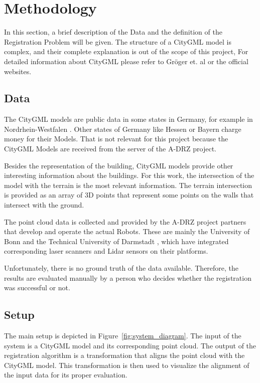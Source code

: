 

    \chapter{Methodology}

    In this section, a brief description of the Data and the definition of the Registration Problem will be given.
    The structure of a CityGML model is complex, and their complete explanation is out of the scope of this project,
    For detailed information about CityGML please refer to Gröger et. al \cite{Groger_2012_OGC} or the official websites.

    \section{Data}
    The CityGML models are public data in some states in Germany, for example in Nordrhein-Westfalen \cite{NRW3DModel_online}. 
    Other states of Germany like Hessen \cite{Hessen3DModel_online} or Bayern \cite{Bayern3DModel_online} charge money for their Models.
    That is not relevant for this project because the CityGML Models are received from the server of the A-DRZ project.

    Besides the representation of the building, CityGML models provide other interesting information about the buildings.
    For this work, the intersection of the model with the terrain is the most relevant information.
    The terrain intersection is provided as an array of 3D points that represent some points on the walls that intersect with the
    ground. 
    
    The point cloud data is collected and provided by the A-DRZ project partners that develop and operate the actual Robots.
    These are mainly the University of Bonn \cite{UniBonn_online} and the Technical University of Darmstadt \cite{TUDarmstadt_online},
    which have integrated corresponding laser scanners and Lidar sensors on their platforms.    

    Unfortunately, there is no ground truth of the data available. 
    Therefore, the results are evaluated manually by a person who decides whether the registration was successful or not.

    \section{Setup}
    The main setup is depicted in Figure~\ref{fig:system_diagram}.
    The input of the system is a CityGML model and its corresponding point cloud. 
    The output of the registration algorithm is a transformation that aligns the point cloud with the CityGML model.
    This transformation is then used to visualize the alignment of the input data for its proper evaluation.

